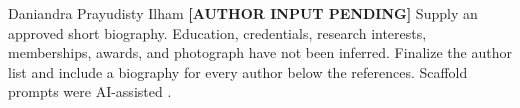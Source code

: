 \begin{IEEEbiographynophoto}{Daniandra Prayudisty Ilham}
\textbf{[AUTHOR INPUT PENDING]} Supply an approved short biography. Education, credentials, research interests, memberships, awards, and photograph have not been inferred. Finalize the author list and include a biography for every author below the references. Scaffold prompts were AI-assisted \cite{ai-system}.
\end{IEEEbiographynophoto}
